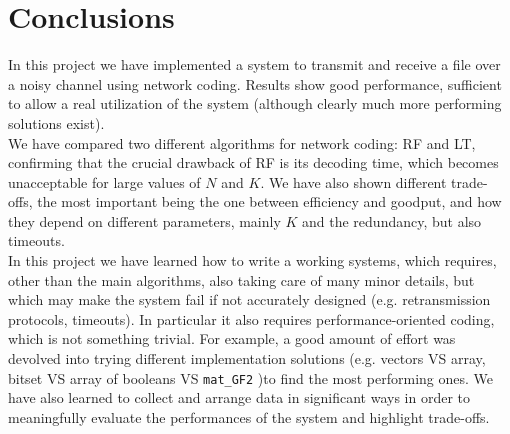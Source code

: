 \section{Conclusions}
In this project we have implemented a system to transmit and receive a file over a noisy channel using network coding. Results show good performance, sufficient to allow a real utilization of the system (although clearly much more performing solutions exist).\\
We have compared two different algorithms for network coding: RF and LT, confirming that the crucial drawback of RF is its decoding time, which becomes unacceptable for large values of $N$ and $K$. We have also shown different trade-offs, the most important being the one between efficiency and goodput, and how they depend on different parameters, mainly $K$ and the redundancy, but also timeouts.\\
In this project we have learned how to write a working systems, which requires, other than the main algorithms, also taking care of many minor details, but which may make the system fail if not accurately designed (e.g. retransmission protocols, timeouts). In particular it also requires performance-oriented coding, which is not something trivial. For example, a good amount of effort was devolved into trying different implementation solutions (e.g. vectors VS array, bitset VS array of booleans VS \texttt{mat\_GF2} )to find the most performing ones. We have also learned to collect and arrange data in significant ways in order to meaningfully evaluate the performances of the system and highlight trade-offs.

